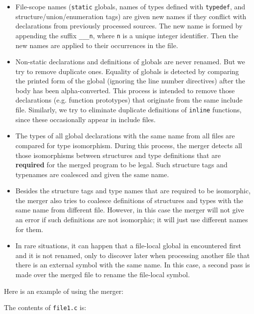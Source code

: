 \documentclass[letterpaper]{article}
\def\t#1{{\tt #1}}
\begin{document}
\begin{itemize}
\item File-scope names (\t{static} globals, names of types defined with
\t{typedef}, and structure/union/enumeration tags) are given new names if they
conflict with declarations from previously processed sources. The new name is
formed by appending the suffix \t{\_\_\_n}, where \t{n} is a unique integer
identifier. Then the new names are applied to their occurrences in the file.

\item Non-static declarations and definitions of globals are never renamed.
But we try to remove duplicate ones. Equality of globals is detected by
comparing the printed form of the global (ignoring the line number directives)
after the body has been alpha-converted. This process is intended to remove
those declarations (e.g. function prototypes) that originate from the same
include file. Similarly, we try to eliminate duplicate definitions of
\t{inline} functions, since these occasionally appear in include files.

\item The types of all global declarations with the same name from all files
are compared for type isomorphism. During this process, the merger detects all
those isomorphisms between structures and type definitions that are {\bf
required} for the merged program to be legal. Such structure tags and
typenames are coalesced and given the same name.

\item Besides the structure tags and type names that are required to be
isomorphic, the merger also tries to coalesce definitions of structures and
types with the same name from different file. However, in this case the merger
will not give an error if such definitions are not isomorphic; it will just
use different names for them.

\item In rare situations, it can happen that a file-local global in
encountered first and it is not renamed, only to discover later when
processing another file that there is an external symbol with the same name.
In this case, a second pass is made over the merged file to rename the
file-local symbol.
\end{itemize}

 Here is an example of using the merger:

 The contents of \t{file1.c} is:
\end{document}
